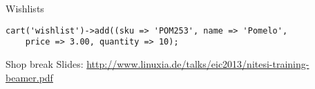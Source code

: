 \begin{frame}[fragile]{Wishlists}
\begin{lstlisting}
cart('wishlist')->add((sku => 'POM253', name => 'Pomelo',
    price => 3.00, quantity => 10);
\end{lstlisting}
\end{frame}

\begin{frame}{Shop break}
Slides:
\url{http://www.linuxia.de/talks/eic2013/nitesi-training-beamer.pdf}
\end{frame}



